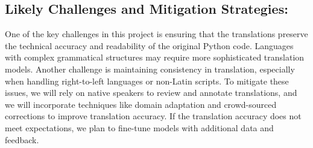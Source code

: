 \documentclass[9pt]{article}
\begin{document}
\subsection{Likely Challenges and Mitigation Strategies: }
    One of the key challenges in this project is ensuring that the translations preserve the technical accuracy and readability of the original Python code. Languages with complex grammatical structures may require more sophisticated translation models. Another challenge is maintaining consistency in translation, especially when handling right-to-left languages or non-Latin scripts. To mitigate these issues, we will rely on native speakers to review and annotate translations, and we will incorporate techniques like domain adaptation and crowd-sourced corrections to improve translation accuracy. If the translation accuracy does not meet expectations, we plan to fine-tune models with additional data and feedback.
\end{document}
